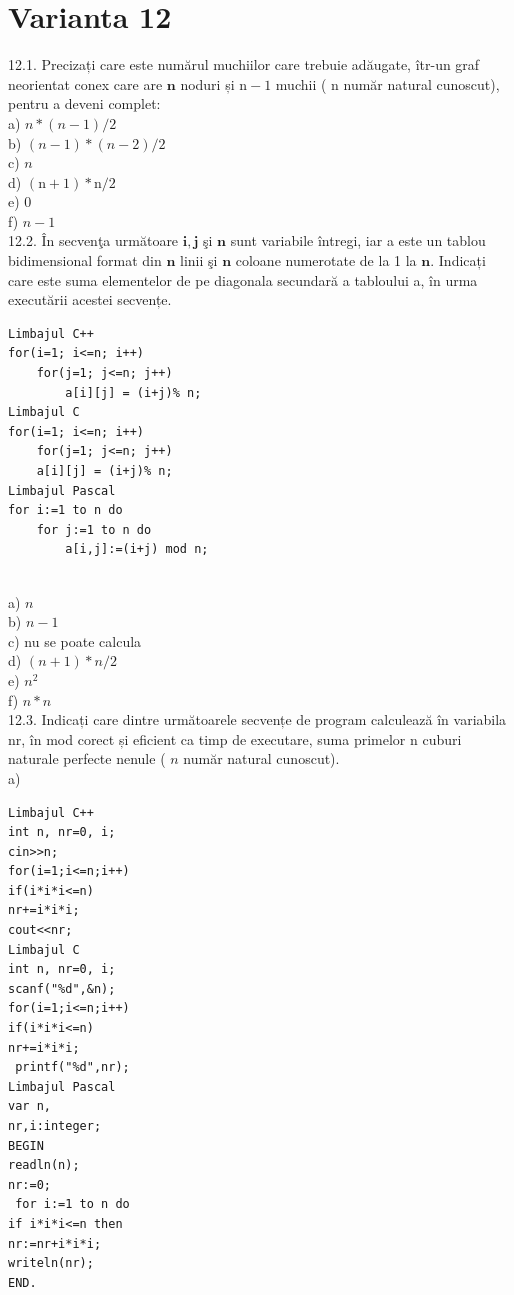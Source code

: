 {\section*{Varianta 12}

12.1. Precizați care este numărul muchiilor care trebuie adăugate, îtr-un graf neorientat conex care are $\mathbf{n}$ noduri și $\mathrm{n}-1$ muchii ( n număr natural cunoscut), pentru a deveni complet:
\\
a) $n *(n-1) / 2$
\\
b) $(n-1) *(n-2) / 2$
\\
c) $n$
\\
d) $(\mathrm{n}+1) * \mathrm{n} / 2$
\\
e) 0
\\
f) $n-1$
\\
12.2. În secvenţa următoare $\mathbf{i}, \mathbf{j}$ şi $\mathbf{n}$ sunt variabile întregi, iar a este un tablou bidimensional format din $\mathbf{n}$ linii şi $\mathbf{n}$ coloane numerotate de la 1 la $\mathbf{n}$. Indicați care este suma elementelor de pe diagonala secundară a tabloului a, în urma executării acestei secvențe.
\begin{verbatim}
Limbajul C++ 
for(i=1; i<=n; i++) 
    for(j=1; j<=n; j++) 
        a[i][j] = (i+j)% n;
Limbajul C 
for(i=1; i<=n; i++) 
    for(j=1; j<=n; j++) 
    a[i][j] = (i+j)% n;
Limbajul Pascal 
for i:=1 to n do 
    for j:=1 to n do 
        a[i,j]:=(i+j) mod n;
\end{verbatim}
\\
a) $n$
\\
b) $n-1$
\\
c) nu se poate calcula
\\
d) $(n+1) * n / 2$
\\
e) $n^{2}$
\\
f) $n * n$
\\
12.3. Indicați care dintre următoarele secvențe de program calculează în variabila nr, în mod corect și eficient ca timp de executare, suma primelor n cuburi naturale perfecte nenule ( $n$ număr natural cunoscut).
\\
a) \begin{verbatim}
Limbajul C++
int n, nr=0, i;
cin>>n;
for(i=1;i<=n;i++)
if(i*i*i<=n)
nr+=i*i*i;
cout<<nr;
Limbajul C 
int n, nr=0, i; 
scanf("%d",&n); 
for(i=1;i<=n;i++) 
if(i*i*i<=n) 
nr+=i*i*i; 
 printf("%d",nr);
Limbajul Pascal 
var n, 
nr,i:integer;  
BEGIN  
readln(n); 
nr:=0; 
 for i:=1 to n do 
if i*i*i<=n then 
nr:=nr+i*i*i; 
writeln(nr);  
END.
\end{verbatim}
}
